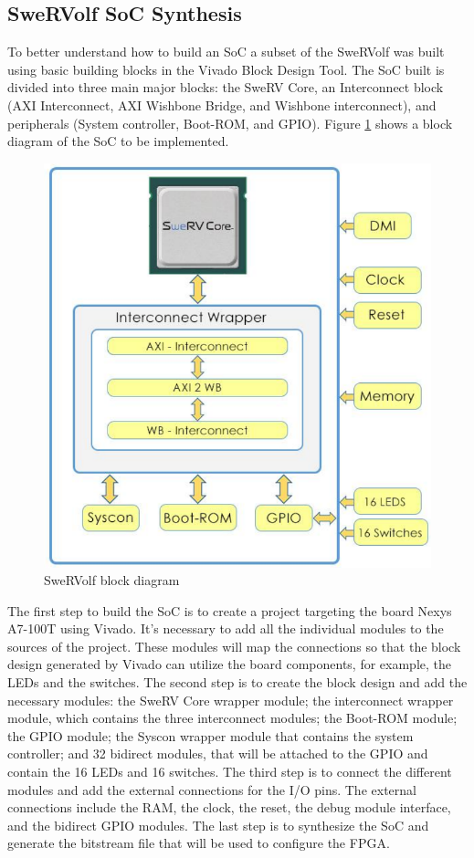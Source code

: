 \subsection{SweRVolf SoC Synthesis}
To better understand how to build an SoC a subset of the SweRVolf was built using basic building blocks in the Vivado Block Design Tool. The SoC built is divided into three main major blocks: the SweRV Core, an Interconnect block (AXI Interconnect, AXI Wishbone Bridge, and Wishbone interconnect), and peripherals (System controller, Boot-ROM, and GPIO). Figure \ref{fig:SweRVolf} shows a block diagram of the SoC to be implemented.

\begin{figure}[ht]
    \centering
    \includegraphics[scale=0.6]{Figures/SweRVolf.png}
    \caption{SweRVolf block diagram}
    \label{fig:SweRVolf}
\end{figure}

The first step to build the SoC is to create a project targeting the board Nexys A7-100T using Vivado. It's necessary to add all the individual modules to the sources of the project. These modules will map the connections so that the block design generated by Vivado can utilize the board components, for example, the LEDs and the switches. The second step is to create the block design and add the necessary modules: the SweRV Core wrapper module; the interconnect wrapper module, which contains the three interconnect modules; the Boot-ROM module; the GPIO module; the Syscon wrapper module that contains the system controller; and 32 bidirect modules, that will be attached to the GPIO and contain the 16 LEDs and 16 switches. The third step is to connect the different modules and add the external connections for the I/O pins. The external connections include the RAM, the clock, the reset, the debug module interface, and the bidirect GPIO modules. The last step is to synthesize the SoC and generate the bitstream file that will be used to configure the FPGA.


